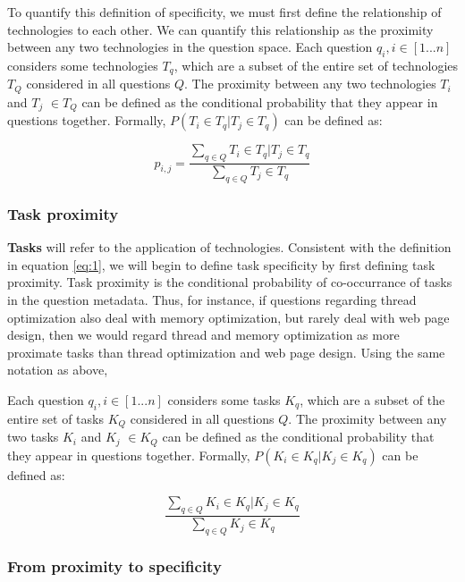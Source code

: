 \documentclass[11pt]{article}
\begin{document}
To quantify this definition of specificity, we must first define the
relationship of technologies to each other. We can quantify this
relationship as the proximity between any two technologies in the
question space. Each question
$q_i, i \in [1...n]$ considers some technologies $T_q$, which are a subset of the entire set of technologies $T_Q$ considered in all
questions $Q$. The proximity between any two technologies $T_i$ and
$T_j$ $\in T_Q$ can be defined as the conditional
probability that they appear in questions together. Formally, $P(T_i
\in T_q | T_j \in T_q)$ can be defined as:

\begin{equation}
  \label{eq:1}
  p_{i,j} = \frac{\sum_{q \in Q} T_i \in T_q | T_j \in T_q}{\sum_{q \in Q} T_j \in T_q}
\end{equation}



\subsubsection{Task proximity}
\label{sec:task-specificity}

\textbf{Tasks} will refer to the application of
technologies. Consistent with the definition in equation \ref{eq:1},
we will begin to define task specificity by first defining task
proximity. Task proximity is the conditional probability of
co-occurrance of tasks in the question metadata. Thus, for instance, if questions regarding thread
optimization also deal with memory optimization, but rarely deal with
web page design, then we would regard thread and memory optimization
as more proximate tasks than thread optimization and web page design. Using the same notation as above, 

Each question
$q_i, i \in [1...n]$ considers some tasks $K_q$, which are a subset of the entire set of tasks $K_Q$ considered in all
questions $Q$. The proximity between any two tasks $K_i$ and
$K_j$ $\in K_Q$ can be defined as the conditional
probability that they appear in questions together. Formally, $P(K_i
\in K_q | K_j \in K_q)$ can be defined as:

\begin{equation}
  \label{eq:2}
  \frac{\sum_{q \in Q} K_i \in K_q | K_j \in K_q}{\sum_{q \in Q} K_j \in K_q}
\end{equation}

\subsubsection{From proximity to specificity}
\label{sec:from-prox-spec}
\end{document}
